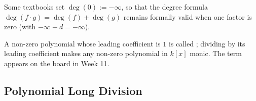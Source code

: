 \begin{aiNote}[Beyond the Lecture: The Convention $\deg(0) = -\infty$]
Some textbooks set $\deg(0) := -\infty$, so that the degree formula $\deg(f \cdot g) = \deg(f) + \deg(g)$ remains formally valid when one factor is zero (with $-\infty + d = -\infty$).
\end{aiNote}

\begin{aiNote}
A non-zero polynomial whose leading coefficient is $1$ is called ; dividing by its leading coefficient makes any non-zero polynomial in $k[x]$ monic. The term appears on the board in Week 11.
\end{aiNote}

\subsection{Polynomial Long Division}

